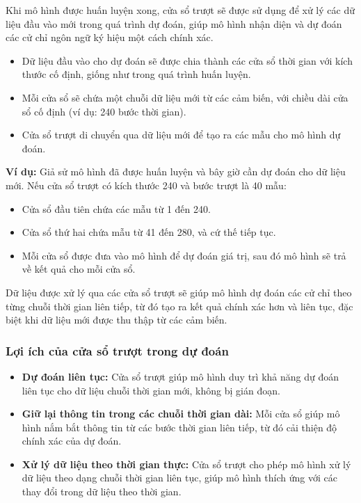 Khi mô hình được huấn luyện xong, cửa sổ trượt sẽ được sử dụng để xử lý các dữ liệu đầu vào mới trong quá trình dự đoán, giúp mô hình nhận diện và dự đoán các cử chỉ ngôn ngữ ký hiệu một cách chính xác.

\begin{itemize}
    \item Dữ liệu đầu vào cho dự đoán sẽ được chia thành các cửa sổ thời gian với kích thước cố định, giống như trong quá trình huấn luyện.
    \item Mỗi cửa sổ sẽ chứa một chuỗi dữ liệu mới từ các cảm biến, với chiều dài cửa sổ cố định (ví dụ: 240 bước thời gian).
    \item Cửa sổ trượt di chuyển qua dữ liệu mới để tạo ra các mẫu cho mô hình dự đoán.
\end{itemize}

\textbf{Ví dụ:} Giả sử mô hình đã được huấn luyện và bây giờ cần dự đoán cho dữ liệu mới. Nếu cửa sổ trượt có kích thước 240 và bước trượt là 40 mẫu:
\begin{itemize}
    \item Cửa sổ đầu tiên chứa các mẫu từ 1 đến 240.
    \item Cửa sổ thứ hai chứa mẫu từ 41 đến 280, và cứ thế tiếp tục.
    \item Mỗi cửa sổ được đưa vào mô hình để dự đoán giá trị, sau đó mô hình sẽ trả về kết quả cho mỗi cửa sổ.
\end{itemize}

Dữ liệu được xử lý qua các cửa sổ trượt sẽ giúp mô hình dự đoán các cử chỉ theo từng chuỗi thời gian liên tiếp, từ đó tạo ra kết quả chính xác hơn và liên tục, đặc biệt khi dữ liệu mới được thu thập từ các cảm biến.

\subsubsection{Lợi ích của cửa sổ trượt trong dự đoán}

\begin{itemize}
    \item \textbf{Dự đoán liên tục:} Cửa sổ trượt giúp mô hình duy trì khả năng dự đoán liên tục cho dữ liệu chuỗi thời gian mới, không bị gián đoạn.
    \item \textbf{Giữ lại thông tin trong các chuỗi thời gian dài:} Mỗi cửa sổ giúp mô hình nắm bắt thông tin từ các bước thời gian liên tiếp, từ đó cải thiện độ chính xác của dự đoán.
    \item \textbf{Xử lý dữ liệu theo thời gian thực:} Cửa sổ trượt cho phép mô hình xử lý dữ liệu theo dạng chuỗi thời gian liên tục, giúp mô hình thích ứng với các thay đổi trong dữ liệu theo thời gian.
\end{itemize}

